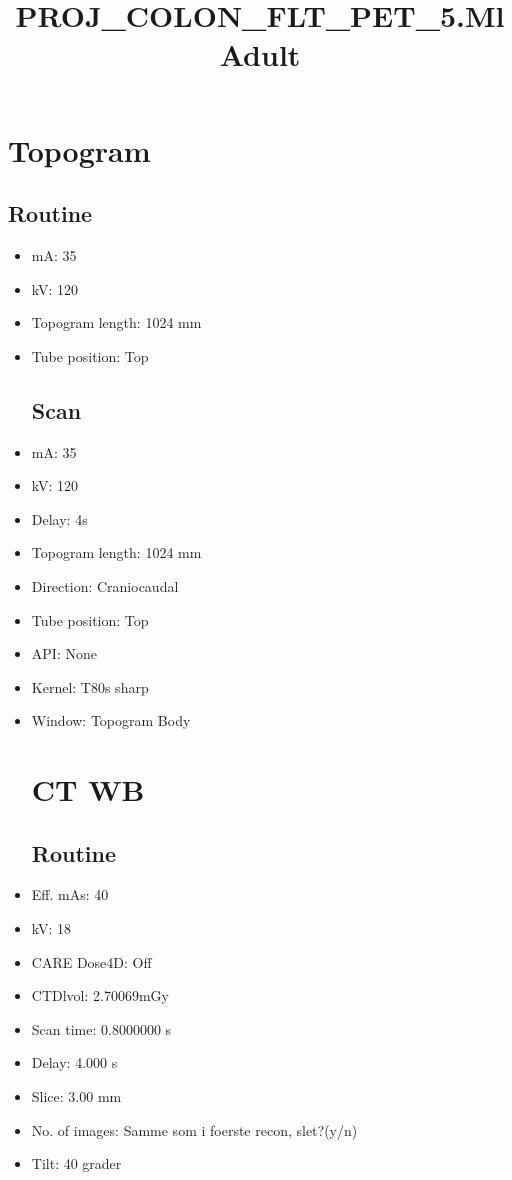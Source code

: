 \documentclass[12pt]{article}
\title{PROJ\_COLON\_FLT\_PET\_5.MlAdult}
\begin{document}
\maketitle
\newpage
\tableofcontents
\newpage
{}


\section{Topogram}
\subsection{Routine}
 \begin{itemize}\item mA: 35\item kV: 120\item Topogram length: 1024 mm\item Tube position: Top
\subsection{Scan}
\item mA: 35\item kV: 120\item Delay: 4s\item Topogram length: 1024 mm\item Direction: Craniocaudal\item Tube position: Top\item API: None\item Kernel: T80s sharp\item Window: Topogram Body
\section{CT WB}
\subsection{Routine}
\item Eff. mAs: 40\item kV: 18\item CARE Dose4D: Off\item CTDlvol: 2.70069mGy\item Scan time: 0.8000000 s\item Delay: 4.000 s\item Slice: 3.00 mm\item No. of images: Samme som i foerste recon, slet?(y/n)\item Tilt: 40 grader

\end{itemize}
\end{document}
